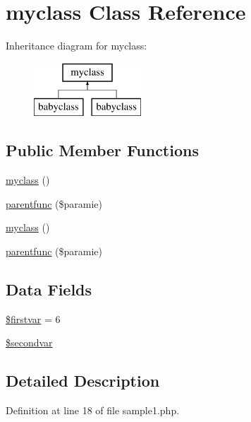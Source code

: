 \hypertarget{classmyclass}{\section{myclass \-Class \-Reference}
\label{classmyclass}
}
\-Inheritance diagram for myclass\-:\begin{figure}[H]
\begin{center}
\leavevmode
\includegraphics[height=2.000000cm]{classmyclass}
\end{center}
\end{figure}
\subsection*{\-Public \-Member \-Functions}
\begin{DoxyCompactItemize}
\item 
\hyperlink{classmyclass_a473e240513d43d36287de79649653e84}{myclass} ()
\item 
\hyperlink{classmyclass_ad9e59edf03f5373b1bb0738f45ece41d}{parentfunc} (\$paramie)
\item 
\hyperlink{classmyclass_a473e240513d43d36287de79649653e84}{myclass} ()
\item 
\hyperlink{classmyclass_ad9e59edf03f5373b1bb0738f45ece41d}{parentfunc} (\$paramie)
\end{DoxyCompactItemize}
\subsection*{\-Data \-Fields}
\begin{DoxyCompactItemize}
\item 
\hyperlink{classmyclass_a6dd72f3e678e8edebbd7e45b4d9c0f9d}{\$firstvar} = 6
\item 
\hyperlink{classmyclass_a380d4f7424ae53505c6ce9bf5a39dffd}{\$secondvar}
\end{DoxyCompactItemize}


\subsection{\-Detailed \-Description}


\-Definition at line 18 of file sample1.\-php.



